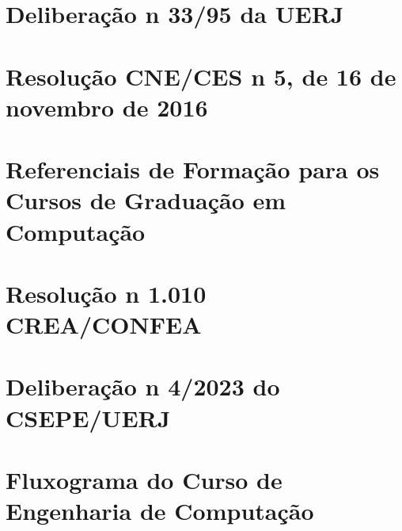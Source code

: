 
\chapter{Deliberação n\textordmasculine{} 33/95 da UERJ}
\label{delib3395}
%


\chapter{Resolução CNE/CES n\textordmasculine{} 5, de 16 de novembro de 2016}
\label{cne}

%

\chapter{Referenciais de Formação para os Cursos de Graduação em Computação}
\label{sbc}


\chapter{Resolução n\textordmasculine{} 1.010 CREA/CONFEA}
\label{res1010}








\chapter{Deliberação n\textordmasculine{} 4/2023 do CSEPE/UERJ}
\label{del4}


\chapter{Fluxograma do Curso de Engenharia de Computação}
\label{fluxograma}

